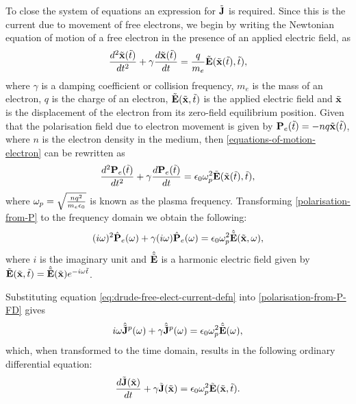 To close the system of equations an expression for $\tilde{\mathbf{J}}$ is required. Since this is the current due to movement of free electrons, we begin by writing the Newtonian equation of motion of a free electron in the presence of an applied electric field, as
\begin{equation}
\frac{d^2 \tilde{\mathbf{x}}(\tilde{t}) }{dt^2}+ \gamma \frac{d \tilde{\mathbf{x}}(\tilde{t}) }{dt}= \frac{q}{m_e}\tilde{\mathbf{E}}(\tilde{\mathbf{x}}(\tilde{t}),\tilde{t}),
\label{equations-of-motion-electron}
\end{equation}
where $\gamma$ is a damping coefficient or collision frequency, $m_e$ is the mass of an electron, $q$ is the charge of an electron, $\tilde{\mathbf{E}}(\tilde{\mathbf{x}},\tilde{t})$ is the applied electric field and $\tilde{\mathbf{x}}$ is the displacement of the electron from its zero-field equilibrium position. Given that the polarisation field due to electron movement is given by $ \mathbf{P}_e(\tilde{t}) = - n q \tilde{\mathbf{x}}(\tilde{t})$, where $n$ is the electron density in the medium, then \eqref{equations-of-motion-electron} can be rewritten as
\begin{equation}
\label{polarisation-from-P}
\frac{d^2 \mathbf{P}_e(\tilde{t}) }{dt^2} + \gamma \frac{d \mathbf{P}_e(\tilde{t}) }{dt} = \epsilon_0 \omega_p^2 \tilde{\mathbf{E}}(\tilde{\mathbf{x}}(\tilde{t}),\tilde{t}),
\end{equation}
where $\omega_p = \sqrt{\frac{n q^2}{m_e \epsilon_0}}$ is known as the plasma frequency.
%
Transforming \eqref{polarisation-from-P} to the frequency domain we obtain the following:
\begin{equation}
\label{polarisation-from-P-FD}
( i \omega )^2 \hat{\mathbf{P}}_e(\omega) + \gamma (i \omega) \hat{\mathbf{P}}_e(\omega) = \epsilon_0 \omega_p^2 \hat{\tilde{\mathbf{E}}}(\tilde{\mathbf{x}},\omega),
\end{equation}
where $i$ is the imaginary unit and $\hat{\tilde{\mathbf{E}}}$ is a harmonic electric field given by $\tilde{\mathbf{E}}(\tilde{\mathbf{x}},\tilde{t}) = \hat{\tilde{\mathbf{E}}}(\tilde{\mathbf{x}}) e^{- i \omega \tilde{t} }$.

Substituting equation \eqref{eq:drude-free-elect-current-defn} into \eqref{polarisation-from-P-FD} gives
\begin{equation}
    \label{eq:pol-current-freq-domain}
  i \omega \hat{\tilde{\mathbf{J}}}^p(\omega) + \gamma \hat{\tilde{\mathbf{J}}}^p(\omega) = \epsilon_0 \omega_p^2 \hat{\tilde{\mathbf{E}}}(\omega) ,
\end{equation}
which, when transformed to the time domain, results in the following ordinary differential equation:
\begin{equation}
  \frac{d \tilde{\mathbf{J}}(\tilde{\mathbf{x}})}{dt} + \gamma \tilde{\mathbf{J}}(\tilde{\mathbf{x}}) = \epsilon_0 \omega_p^2 \tilde{\mathbf{E}}(\tilde{\mathbf{x}},\tilde{t}).
  \label{pol-current-ADE}
\end{equation}

